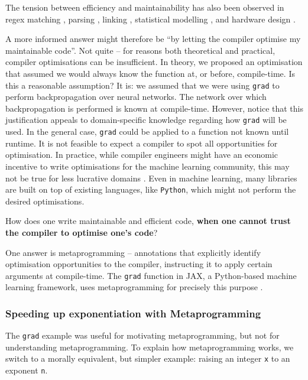 The tension between efficiency and maintainability has also been observed in regex matching \citep{tratt-2008}, parsing \citep{yallop-2023}, linking \citep{servetto-2013}, statistical modelling \citep{wickham-2019}, and hardware design \citep{vandebon-2021}.

A more informed answer might therefore be ``by letting the compiler optimise my maintainable code''. Not quite -- for reasons both theoretical and practical, compiler optimisations can be insufficient. In theory, we proposed an optimisation that assumed we would always know the function at, or before, compile-time. Is this a reasonable assumption? It is: we assumed that we were using \texttt{grad} to perform backpropagation over neural networks. The network over which backpropagation is performed is known at compile-time. However, notice that this justification appeals to domain-specific knowledge regarding how \texttt{grad} will be used. In the general case, \texttt{grad} could be applied to a function not known until runtime. It is not feasible to expect a compiler to spot all opportunities for optimisation. In practice, while compiler engineers might have an economic incentive to write optimisations for the machine learning community, this may not be true for less lucrative domains \citep{robinson-01}. Even in machine learning, many libraries are built on top of existing languages, like \texttt{Python}, which might not perform the desired optimisations.

How does one write maintainable and efficient code, \textbf{when one cannot trust the compiler to optimise one's code}?

One answer is metaprogramming -- annotations that explicitly identify optimisation opportunities to the compiler, instructing it to apply certain arguments at compile-time. The \texttt{grad} function in JAX, a Python-based machine learning framework, uses metaprogramming for precisely this purpose \citep{jax-grad-metaprogramming}.


\subsubsection{Speeding up exponentiation with Metaprogramming}
The \texttt{grad} example was useful for motivating metaprogramming, but not for understanding metaprogramming. To explain how metaprogramming works, we switch to a morally equivalent, but simpler example: raising an integer \texttt{x} to an exponent \texttt{n}.

